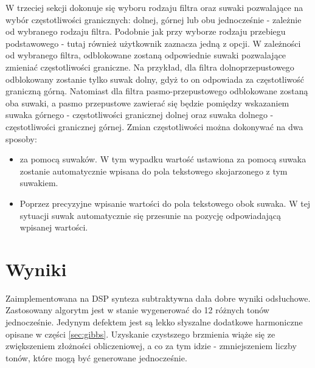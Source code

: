 W trzeciej sekcji dokonuje się wyboru rodzaju filtra oraz suwaki pozwalające na wybór częstotliwości granicznych: dolnej, górnej lub obu jednocześnie - zależnie od wybranego rodzaju filtra. Podobnie jak przy wyborze rodzaju przebiegu podstawowego - tutaj również użytkownik zaznacza jedną z opcji. W zależności od wybranego filtra, odblokowane zostaną odpowiednie suwaki pozwalające zmieniać częstotliwości graniczne. Na przykład, dla filtra dolnoprzepustowego odblokowany zostanie tylko suwak dolny, gdyż to on odpowiada za częstotliwość graniczną górną. Natomiast dla filtra pasmo-przepustowego odblokowane zostaną oba suwaki, a pasmo przepustowe zawierać się będzie pomiędzy wskazaniem suwaka górnego - częstotliwości granicznej dolnej oraz suwaka dolnego - częstotliwości granicznej górnej.
Zmian częstotliwości można dokonywać na dwa sposoby:
\begin{itemize}
	\item za pomocą suwaków. W tym wypadku wartość ustawiona za pomocą suwaka zostanie automatycznie wpisana do pola tekstowego skojarzonego z tym suwakiem.
	\item Poprzez precyzyjne wpisanie wartości do pola tekstowego obok suwaka. W tej sytuacji suwak automatycznie się przesunie na pozycję odpowiadającą wpisanej wartości.
\end{itemize}

\section{Wyniki}
Zaimplementowana na DSP synteza subtraktywna dała dobre wyniki odsłuchowe. Zastosowany algorytm jest w stanie wygenerować do 12 różnych tonów jednocześnie. Jedynym defektem jest są lekko słyszalne dodatkowe harmoniczne opisane w części \ref{sec:gibbs}. Uzyskanie czystszego brzmienia wiąże się ze zwiększeniem złożności obliczeniowej, a co za tym idzie - zmniejszeniem liczby tonów, które mogą być generowane jednocześnie.
